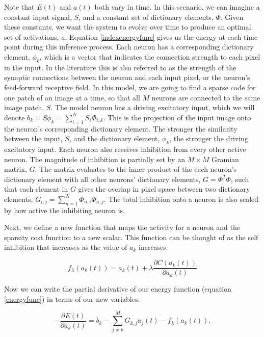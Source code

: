 Note that $E(t)$ and $a(t)$ both vary in time. In this scenario, we can imagine a constant input signal, $S$, and a constant set of dictionary elements, $\Phi$. Given these constants, we want the system to evolve over time to produce an optimal set of activations, $a$. Equation \eqref{indexenergyfunc} gives us the energy at each time point during this inference process. Each neuron has a corresponding dictionary element, $\phi_{k}$, which is a vector that indicates the connection strength to each pixel in the input. In the literature this is also referred to as the strength of the synaptic connections between the neuron and each input pixel, or the neuron's feed-forward receptive field. In this model, we are going to find a sparse code for one patch of an image at a time, so that all $M$ neurons are connected to the same image patch, $S$. The model neuron has a driving excitatory input, which we will denote $b_{k} = S\phi_{k} = \sum_{i=1}^{N}S_{i} \Phi_{i,k}$. This is the projection of the input image onto the neuron's corresponding dictionary element. The stronger the similarity between the input, $S$, and the dictionary element, $\phi_{k}$, the stronger the driving excitatory input. Each neuron also receives inhibition from every other active neuron. The magnitude of inhibition is partially set by an $M \times M$ Gramian matrix, $G$. The matrix evaluates to the inner product of the each neuron's dictionary element with all other neurons' dictionary elements, $G = \Phi^T\Phi$, such that each element in $G$ gives the overlap in pixel space between two dictionary elements, $G_{i,j} = \sum\limits_{n=1}^{N} \Phi_{n,i}\Phi_{n,j}$. The total inhibition onto a neuron is also scaled by how active the inhibiting neuron is.

Next, we define a new function that maps the activity for a neuron and the sparsity cost function to a new scalar. This function can be thought of as the self inhibition that increases as the value of $a_{k}$ increases:

\begin{equation}\label{hopfieldtfunc}
f_{\lambda}(a_{k}(t)) = a_{k}(t) + \lambda \frac{\partial C(a_{k}(t))}{\partial a_{k}(t)}
\end{equation}

Now we can write the partial derivative of our energy function (equation \eqref{energyfunc}) in terms of our new variables:

\begin{equation}\label{dedasimple}
    - \frac{\partial E(t)}{\partial a_{k}(t)} =
    b_{k} -
    \sum\limits_{j \neq k}^{M} G_{k,j} a_{j}(t) -
    f_{\lambda}(a_{k}(t)).
\end{equation}

